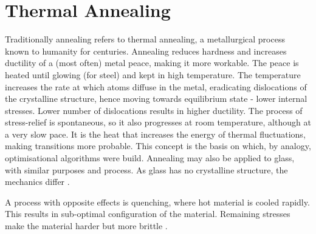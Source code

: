 \section{Thermal Annealing} \label{sec:thermal_annealing}
Traditionally annealing refers to thermal annealing, a metallurgical process known to humanity for centuries. Annealing reduces hardness and increases ductility of a (most often) metal peace, making it more workable. The peace is heated until glowing (for steel) and kept in high temperature. The temperature increases the rate at which atoms diffuse in the metal, eradicating dislocations of the crystalline structure, hence moving towards equilibrium state - lower internal stresses. Lower number of dislocations results in higher ductility. The process of stress-relief is spontaneous, so it also progresses at room temperature, although at a very slow pace. It is the heat that increases the energy of thermal fluctuations, making transitions more probable. This concept is the basis on which, by analogy, optimisational algorithms were build. Annealing may also be applied to glass, with similar purposes and process. As glass has no crystalline structure, the mechanics differ \cite{wikipedia_contributors_annealing_2021}.

A process with opposite effects is quenching, where hot material is cooled rapidly. This results in sub-optimal configuration of the material. Remaining stresses make the material harder but more brittle \cite{wikipedia_contributors_quenching_2021}.